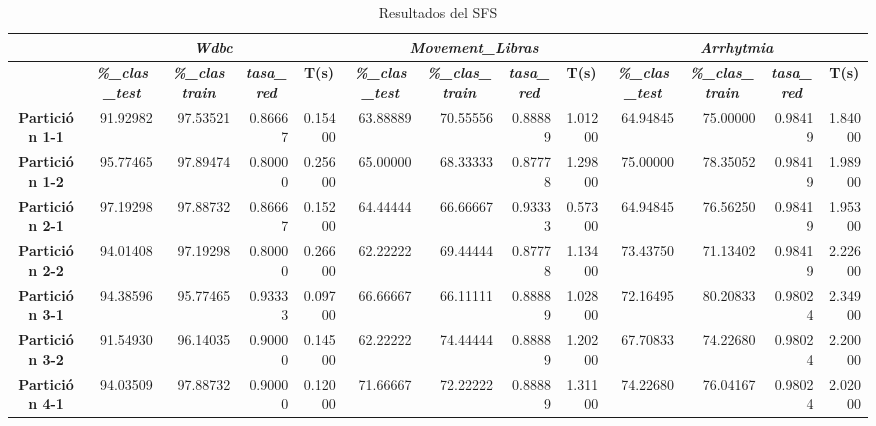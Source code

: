 \documentclass[a4paper,11pt]{article}
\begin{document}
   \begin{table}[H]	
    \caption{Resultados del SFS}
    \begin{adjustbox}{width=1.1\textwidth}
   \begin{tabular}{|c|r|r|r|r|r|r|r|r|r|r|r|r|}
    \hline
    \multicolumn{1}{|l|}{} & \multicolumn{ 4}{c|}{\textbf{\textit{Wdbc}}} & \multicolumn{ 4}{c|}{\textbf{\textit{Movement\_Libras}}} & \multicolumn{ 4}{c|}{\textbf{\textit{Arrhytmia}}} \\ \hline
    \multicolumn{1}{|l|}{} & \multicolumn{1}{c|}{\textbf{\textit{\%\_clas\_test}}} & \multicolumn{1}{c|}{\textbf{\textit{\%\_clas train}}} & \multicolumn{1}{c|}{\textbf{\textit{tasa\_red}}} & \multicolumn{1}{c|}{\textbf{T(s)}} & \multicolumn{1}{c|}{\textbf{\textit{\%\_clas\_test}}} & \multicolumn{1}{c|}{\textbf{\textit{\%\_clas\_train}}} & \multicolumn{1}{c|}{\textbf{\textit{tasa\_red}}} & \multicolumn{1}{c|}{\textbf{T(s)}} & \multicolumn{1}{c|}{\textbf{\textit{\%\_clas\_test}}} & \multicolumn{1}{c|}{\textbf{\textit{\%\_clas\_train}}} & \multicolumn{1}{c|}{\textbf{\textit{tasa\_red}}} & \multicolumn{1}{c|}{\textbf{T(s)}} \\ \hline
    \textbf{Partición 1-1} & 91.92982 & 97.53521 & 0.86667 & 0.15400 & 63.88889 & 70.55556 & 0.88889 & 1.01200 & 64.94845 & 75.00000 & 0.98419 & 1.84000 \\ \hline
    \textbf{Partición 1-2} & 95.77465 & 97.89474 & 0.80000 & 0.25600 & 65.00000 & 68.33333 & 0.87778 & 1.29800 & 75.00000 & 78.35052 & 0.98419 & 1.98900 \\ \hline
    \textbf{Partición 2-1} & 97.19298 & 97.88732 & 0.86667 & 0.15200 & 64.44444 & 66.66667 & 0.93333 & 0.57300 & 64.94845 & 76.56250 & 0.98419 & 1.95300 \\ \hline
    \textbf{Partición 2-2} & 94.01408 & 97.19298 & 0.80000 & 0.26600 & 62.22222 & 69.44444 & 0.87778 & 1.13400 & 73.43750 & 71.13402 & 0.98419 & 2.22600 \\ \hline
    \textbf{Partición 3-1} & 94.38596 & 95.77465 & 0.93333 & 0.09700 & 66.66667 & 66.11111 & 0.88889 & 1.02800 & 72.16495 & 80.20833 & 0.98024 & 2.34900 \\ \hline
    \textbf{Partición 3-2} & 91.54930 & 96.14035 & 0.90000 & 0.14500 & 62.22222 & 74.44444 & 0.88889 & 1.20200 & 67.70833 & 74.22680 & 0.98024 & 2.20000 \\ \hline
    \textbf{Partición 4-1} & 94.03509 & 97.88732 & 0.90000 & 0.12000 & 71.66667 & 72.22222 & 0.88889 & 1.31100 & 74.22680 & 76.04167 & 0.98024 & 2.02000 \\ \hline

\end{tabular}
\end{adjustbox}
\end{table}
\end{document}
